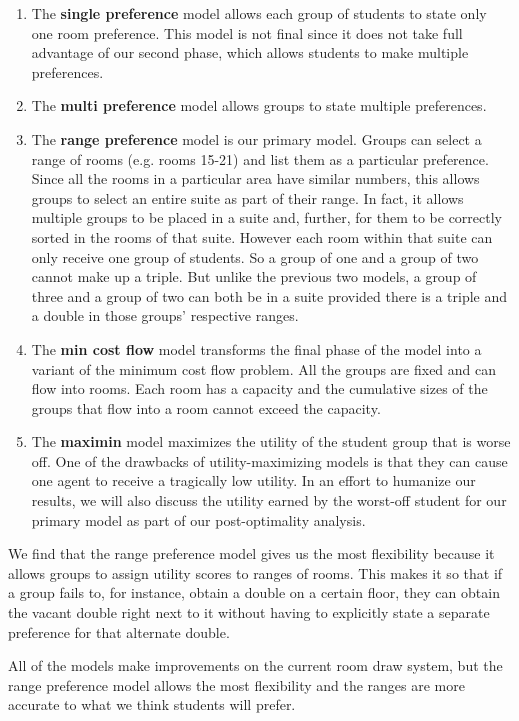 \documentclass[12pt]{article}
\begin{document}
    \begin{enumerate}
        \item The \textbf{single preference} model allows each group of students to state only one room preference. This model is not final since it does not take full advantage of our second phase, which allows students to make multiple preferences. 
        \item The \textbf{multi preference} model allows groups to state multiple preferences. 
        \item The \textbf{range preference} model is our primary model. Groups can select a range of rooms (e.g. rooms 15-21) and list them as a particular preference. Since all the rooms in a particular area have similar numbers, this allows groups to select an entire suite as part of their range. In fact, it allows multiple groups to be placed in a suite and, further, for them to be correctly sorted in the rooms of that suite. However each room within that suite can only receive one group of students. So a group of one and a group of two cannot make up a triple. But unlike the previous two models, a group of three and a group of two can both be in a suite provided there is a triple and a double in those groups' respective ranges.
        \item The \textbf{min cost flow} model transforms the final phase of the model into a variant of the minimum cost flow problem. All the groups are fixed and can flow into rooms. Each room has a capacity and the cumulative sizes of the groups that flow into a room cannot exceed the capacity. 
        \item The \textbf{maximin} model maximizes the utility of the student group that is worse off. One of the drawbacks of utility-maximizing models is that they can cause one agent to receive a tragically low utility. In an effort to humanize our results, we will also discuss the utility earned by the worst-off student for our primary model as part of our post-optimality analysis. 
    \end{enumerate}
    
   We find that the range preference model gives us the most flexibility because it allows groups to assign utility scores to ranges of rooms. This makes it so that if a group fails to, for instance, obtain a double on a certain floor, they can obtain the vacant double right next to it without having to explicitly state a separate preference for that alternate double. 
   
   All of the models make improvements on the current room draw system, but the range preference model allows the most flexibility and the ranges are more accurate to what we think students will prefer. 
   
\end{document}
